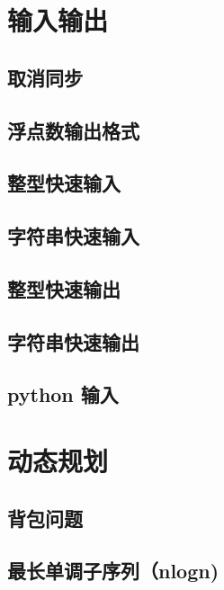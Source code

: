 \chapter{输入输出}
\section{取消同步}
\raggedbottom
\hrulefill
\section{浮点数输出格式}
\raggedbottom
\hrulefill
\section{整型快速输入}
\raggedbottom
\hrulefill
\section{字符串快速输入}
\raggedbottom
\hrulefill
\section{整型快速输出}
\raggedbottom
\hrulefill
\section{字符串快速输出}
\raggedbottom
\hrulefill
\section{python 输入}
\raggedbottom
\hrulefill

\chapter{动态规划}
\section{背包问题}
\raggedbottom
\hrulefill
\section{最长单调子序列（nlogn)}
\raggedbottom
\hrulefill
